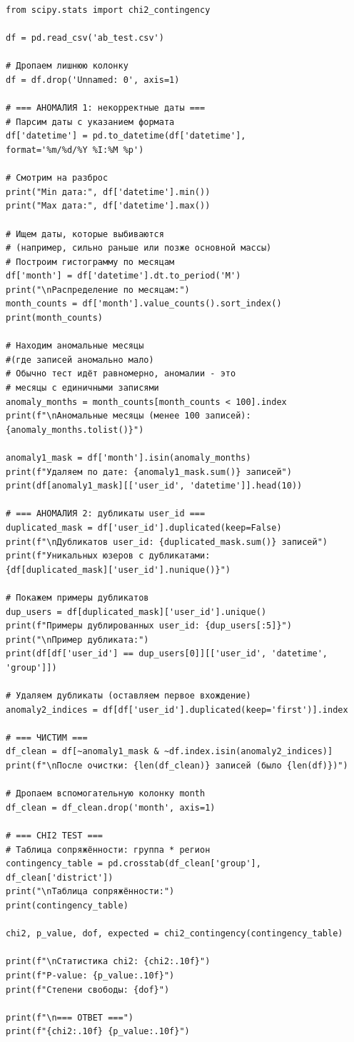 \documentclass[pract]{SCWorks}
\begin{document}
\begin{verbatim}
from scipy.stats import chi2_contingency

df = pd.read_csv('ab_test.csv')

# Дропаем лишнюю колонку
df = df.drop('Unnamed: 0', axis=1)

# === АНОМАЛИЯ 1: некорректные даты ===
# Парсим даты с указанием формата
df['datetime'] = pd.to_datetime(df['datetime'], 
format='%m/%d/%Y %I:%M %p')

# Смотрим на разброс
print("Min дата:", df['datetime'].min())
print("Max дата:", df['datetime'].max())

# Ищем даты, которые выбиваются 
# (например, сильно раньше или позже основной массы)
# Построим гистограмму по месяцам
df['month'] = df['datetime'].dt.to_period('M')
print("\nРаспределение по месяцам:")
month_counts = df['month'].value_counts().sort_index()
print(month_counts)

# Находим аномальные месяцы 
#(где записей аномально мало)
# Обычно тест идёт равномерно, аномалии - это 
# месяцы с единичными записями
anomaly_months = month_counts[month_counts < 100].index
print(f"\nАномальные месяцы (менее 100 записей): 
{anomaly_months.tolist()}")

anomaly1_mask = df['month'].isin(anomaly_months)
print(f"Удаляем по дате: {anomaly1_mask.sum()} записей")
print(df[anomaly1_mask][['user_id', 'datetime']].head(10))

# === АНОМАЛИЯ 2: дубликаты user_id ===
duplicated_mask = df['user_id'].duplicated(keep=False)
print(f"\nДубликатов user_id: {duplicated_mask.sum()} записей")
print(f"Уникальных юзеров с дубликатами: 
{df[duplicated_mask]['user_id'].nunique()}")

# Покажем примеры дубликатов
dup_users = df[duplicated_mask]['user_id'].unique()
print(f"Примеры дублированных user_id: {dup_users[:5]}")
print("\nПример дубликата:")
print(df[df['user_id'] == dup_users[0]][['user_id', 'datetime', 'group']])

# Удаляем дубликаты (оставляем первое вхождение)
anomaly2_indices = df[df['user_id'].duplicated(keep='first')].index

# === ЧИСТИМ ===
df_clean = df[~anomaly1_mask & ~df.index.isin(anomaly2_indices)]
print(f"\nПосле очистки: {len(df_clean)} записей (было {len(df)})")

# Дропаем вспомогательную колонку month
df_clean = df_clean.drop('month', axis=1)

# === CHI2 TEST ===
# Таблица сопряжённости: группа * регион
contingency_table = pd.crosstab(df_clean['group'], df_clean['district'])
print("\nТаблица сопряжённости:")
print(contingency_table)

chi2, p_value, dof, expected = chi2_contingency(contingency_table)

print(f"\nСтатистика chi2: {chi2:.10f}")
print(f"P-value: {p_value:.10f}")
print(f"Степени свободы: {dof}")

print(f"\n=== ОТВЕТ ===")
print(f"{chi2:.10f} {p_value:.10f}")
\end{verbatim}
\end{document}
